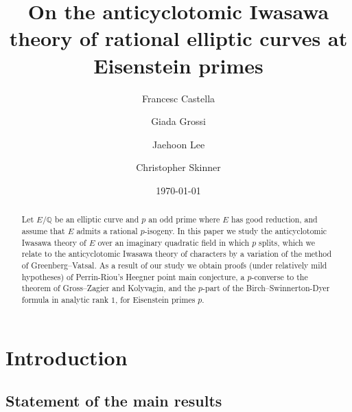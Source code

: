 \documentclass[10pt]{amsart}
\numberwithin{equation}{section}
\theoremstyle{definition}
\theoremstyle{remark}
\renewcommand{\thetheorem}{\arabic{section}.\arabic{subsection}.\arabic{theorem}}
\begin{document}
\title[On the anticyclotomic
Iwasawa theory of rational elliptic curves at Eisenstein primes]{On the anticyclotomic Iwasawa theory of rational elliptic curves at Eisenstein primes}

\author{Francesc Castella}
\address[F.~Castella]{University of California Santa Barbara, South Hall, Santa Barbara, CA 93106, USA}

\author{Giada Grossi}
\address[G.~Grossi]{Institut Galilée, Université Sorbonne Paris Nord, 93430 Villetaneuse, FRANCE}
 
\author{Jaehoon Lee}  
\address[J.~Lee]{KAIST, 291 Daehak-ro, Yuseong-gu, Daejeon 34141, Republic of Korea}
 
\author{Christopher Skinner} 
\address[C.~Skinner]{Princeton University, Fine Hall, Washington Road, Princeton, NJ 08544-1000, USA}

\date{\today}



\begin{abstract}
Let $E/\mathbb{Q}$ be an elliptic curve and $p$ an odd prime where $E$ has good reduction, and assume that $E$ admits a rational $p$-isogeny. In this paper we study the anticyclotomic Iwasawa theory of $E$ over an imaginary quadratic field in which $p$ splits, which we relate to the anticyclotomic Iwasawa theory of characters 
by a variation of the method of Greenberg--Vatsal. As a result of our study we obtain proofs (under relatively mild hypotheses) of Perrin-Riou's Heegner point main conjecture, a $p$-converse to the theorem of Gross--Zagier and Kolyvagin, and the $p$-part of the Birch--Swinnerton-Dyer formula in analytic rank $1$, for Eisenstein primes $p$. 
\end{abstract}
\maketitle

\tableofcontents

\section*{Introduction}
\renewcommand{\thetheorem}{\Alph{theorem}}

\subsection{Statement of the main results}
\end{document}
